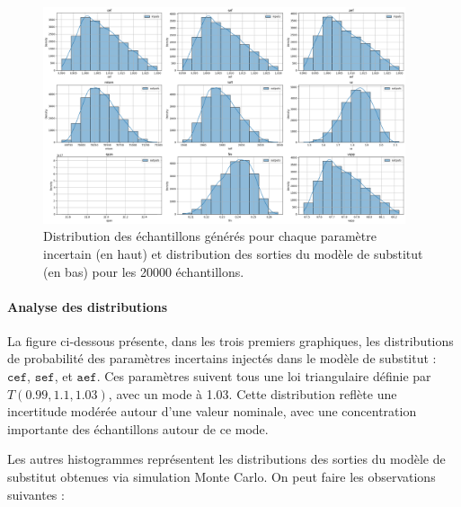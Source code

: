 \documentclass[a4paper, 11pt]{article}
\begin{document}
\begin{figure}[h]
    \centering
    \includegraphics[width=0.95\textwidth]{Images_Ayoub/Problem2/UseCase1/Estimating_Quantities/Input_Output_Distributions/Input_Output_Distributions.png}
    \caption{Distribution des échantillons générés pour chaque paramètre incertain (en haut) et distribution des sorties du modèle de substitut (en bas) pour les 20000 échantillons.}
    \label{fig:input_output_distributions}
\end{figure}


\paragraph{Analyse des distributions}

La figure ci-dessous présente, dans les trois premiers graphiques, les distributions de probabilité des paramètres incertains injectés dans le modèle de substitut : \( \texttt{cef} \), \( \texttt{sef} \), et \( \texttt{aef} \). Ces paramètres suivent tous une loi triangulaire définie par \( T(0.99, 1.1, 1.03) \), avec un mode à 1.03. Cette distribution reflète une incertitude modérée autour d’une valeur nominale, avec une concentration importante des échantillons autour de ce mode.

Les autres histogrammes représentent les distributions des sorties du modèle de substitut obtenues via simulation Monte Carlo. On peut faire les observations suivantes :
\end{document}

